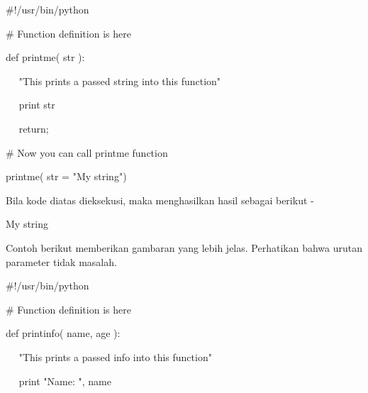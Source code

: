 \vspace{\baselineskip}
\noindent 
 \hspace*{0.5in}  $  \#  $!/usr/bin/python \par
\vspace{12pt}
\noindent 
 \hspace*{0.5in}  $  \#  $ Function definition is here \par
\noindent 
 \hspace*{0.5in} def printme( str ): \par
\noindent 
 \hspace*{0.5in} ~~ "This prints a passed string into this function" \par
\noindent 
 \hspace*{0.5in} ~~ print str \par
\noindent 
 \hspace*{0.5in} ~~ return; \par
\vspace{12pt}
\noindent 
 \hspace*{0.5in}  $  \#  $ Now you can call printme function \par
\noindent 
 \hspace*{0.5in} printme( str = "My string") \par
 \vspace{\baselineskip}
\noindent 
Bila kode diatas dieksekusi, maka menghasilkan hasil sebagai berikut - \par
\noindent 
 \hspace*{0.5in} My string \par
 \vspace{\baselineskip}
\noindent 
Contoh berikut memberikan gambaran yang lebih jelas. Perhatikan bahwa urutan parameter tidak masalah. \par
\noindent 
 \hspace*{0.5in}  $  \#  $!/usr/bin/python \par
\vspace{12pt}
\noindent 
 \hspace*{0.5in}  $  \#  $ Function definition is here \par
\noindent 
 \hspace*{0.5in} def printinfo( name, age ): \par
\noindent 
 \hspace*{0.5in} ~~ "This prints a passed info into this function" \par
\noindent 
 \hspace*{0.5in} ~~ print "Name: ", name \par
